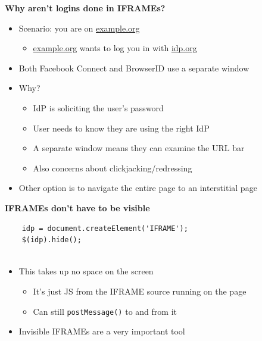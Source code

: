 \documentclass[helvetica]{seminar}
\newcommand{\heading}[1]{%
  \begin{center} 
    \large\bf 
    #1 
  \end{center} 
  \vspace{.4 in}}
\begin{document}
\begin{slide}
\heading{Why aren't logins done in IFRAMEs?}

\begin{itemize}
\item Scenario: you are on \url{example.org}
  \begin{itemize}
  \item \url{example.org} wants to log you in with \url{idp.org}
  \end{itemize}

\item Both Facebook Connect and BrowserID use a separate window
\item Why?
  \begin{itemize}
  \item IdP is soliciting the user's password
  \item User needs to know they are using the right IdP
  \item A separate window means they can examine the URL bar
  \item Also concerns about clickjacking/redressing
  \end{itemize}

\item Other option is to navigate the entire page to an interstitial page
\end{itemize}
\end{slide}



\begin{slide}
\heading{IFRAMEs don't have to be visible}

\begin{verbatim}
	idp = document.createElement('IFRAME');
	$(idp).hide();


\end{verbatim}

\begin{itemize}
\item This takes up no space on the screen
\begin{itemize}
\item It's just JS from the IFRAME source running on the page
\item Can still \verb^postMessage()^ to and from it
\end{itemize}
\item Invisible IFRAMEs are a very important tool
\end{itemize}
\end{slide}
\end{document}
